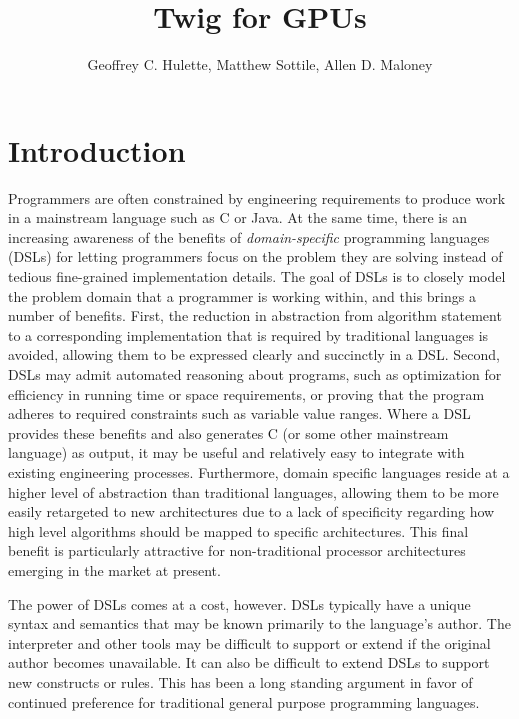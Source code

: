 \documentclass[11pt]{article}
\title{Twig for GPUs}
\author{Geoffrey C. Hulette, Matthew Sottile, Allen D. Maloney}
\begin{document}
\maketitle
\thispagestyle{empty}

\section{Introduction}

Programmers are often constrained by engineering requirements to produce work
in a mainstream language such as C or Java. At the same time, there is an
increasing awareness of the benefits of \emph{domain-specific} programming
languages (DSLs) for letting programmers focus on the problem they are solving
instead of tedious fine-grained implementation details. The goal of DSLs is to
closely model the problem domain that a programmer is working within, and this
brings a number of benefits. First, the reduction in abstraction from
algorithm statement to a corresponding implementation that is required by
traditional languages is avoided, allowing them to be expressed clearly and
succinctly in a DSL. Second, DSLs may admit automated reasoning about
programs, such as optimization for efficiency in running time or space
requirements, or proving that the program adheres to required constraints such
as variable value ranges. Where a DSL provides these benefits and also
generates C (or some other mainstream language) as output, it may be useful
and relatively easy to integrate with existing engineering processes.
Furthermore, domain specific languages reside at a higher level of abstraction
than traditional languages, allowing them to be more easily retargeted to new
architectures due to a lack of specificity regarding how high level algorithms
should be mapped to specific architectures. This final benefit is particularly
attractive for non-traditional processor architectures emerging in the market
at present.

The power of DSLs comes at a cost, however. DSLs typically have a unique
syntax and semantics that may be known primarily to the language's author. The
interpreter and other tools may be difficult to support or extend if the
original author becomes unavailable. It can also be difficult to extend DSLs
to support new constructs or rules. This has been a long standing argument in
favor of continued preference for traditional general purpose programming
languages.

\end{document}
